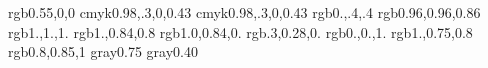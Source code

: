 %
%
%
%
\usepackage{graphics}
\usepackage{color}
\usepackage{epsfig}

\setlength{\topmargin}{-0.75in}
\setlength{\textheight}{7in}


\definecolor{headcolor}     {rgb}{0.55,0,0}
\definecolor{titlecolor}    {cmyk}{0.98,.3,0,0.43}
\definecolor{tickmarkcolor} {cmyk}{0.98,.3,0,0.43}
\definecolor{refcolor}      {rgb}{0.,.4,.4}
\definecolor{Beige}         {rgb}{0.96,0.96,0.86}
\definecolor{Background}    {rgb}{1.,1.,1.}
\definecolor{MyYellow}      {rgb}{1.,0.84,0.8}
\definecolor{Gold}          {rgb}{1.0,0.84,0.}
\definecolor{DarkGold}      {rgb}{.3,0.28,0.}
\definecolor{Blue}          {rgb}{0.,0.,1.}
\definecolor{Pink}          {rgb}{1.,0.75,0.8}
\definecolor{light-blue}    {rgb}{0.8,0.85,1}
\definecolor{mygrey}        {gray}{0.75}
\definecolor{darkgrey}      {gray}{0.40}

%

